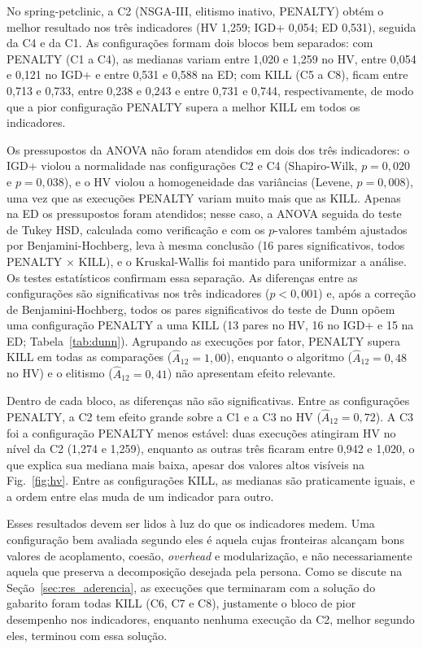 \documentclass[conference]{IEEEtran}
\begin{document}
No spring-petclinic, a C2 (NSGA-III, elitismo inativo, PENALTY) obtém o melhor resultado nos três indicadores (HV 1,259; IGD+ 0,054; ED 0,531), seguida da C4 e da C1. As configurações formam dois blocos bem separados: com PENALTY (C1 a C4), as medianas variam entre 1,020 e 1,259 no HV, entre 0,054 e 0,121 no IGD+ e entre 0,531 e 0,588 na ED; com KILL (C5 a C8), ficam entre 0,713 e 0,733, entre 0,238 e 0,243 e entre 0,731 e 0,744, respectivamente, de modo que a pior configuração PENALTY supera a melhor KILL em todos os indicadores.

Os pressupostos da ANOVA não foram atendidos em dois dos três indicadores: o IGD+ violou a normalidade nas configurações C2 e C4 (Shapiro-Wilk, $p=0{,}020$ e $p=0{,}038$), e o HV violou a homogeneidade das variâncias (Levene, $p=0{,}008$), uma vez que as execuções PENALTY variam muito mais que as KILL. Apenas na ED os pressupostos foram atendidos; nesse caso, a ANOVA seguida do teste de Tukey HSD, calculada como verificação e com os $p$-valores também ajustados por Benjamini-Hochberg, leva à mesma conclusão (16 pares significativos, todos PENALTY $\times$ KILL), e o Kruskal-Wallis foi mantido para uniformizar a análise. Os testes estatísticos confirmam essa separação. As diferenças entre as configurações são significativas nos três indicadores ($p<0{,}001$) e, após a correção de Benjamini-Hochberg, todos os pares significativos do teste de Dunn opõem uma configuração PENALTY a uma KILL (13 pares no HV, 16 no IGD+ e 15 na ED; Tabela~\ref{tab:dunn}). Agrupando as execuções por fator, PENALTY supera KILL em todas as comparações ($\hat{A}_{12}=1{,}00$), enquanto o algoritmo ($\hat{A}_{12}=0{,}48$ no HV) e o elitismo ($\hat{A}_{12}=0{,}41$) não apresentam efeito relevante.

Dentro de cada bloco, as diferenças não são significativas. Entre as configurações PENALTY, a C2 tem efeito grande sobre a C1 e a C3 no HV ($\hat{A}_{12}=0{,}72$). A C3 foi a configuração PENALTY menos estável: duas execuções atingiram HV no nível da C2 (1,274 e 1,259), enquanto as outras três ficaram entre 0,942 e 1,020, o que explica sua mediana mais baixa, apesar dos valores altos visíveis na Fig.~\ref{fig:hv}. Entre as configurações KILL, as medianas são praticamente iguais, e a ordem entre elas muda de um indicador para outro.

Esses resultados devem ser lidos à luz do que os indicadores medem. Uma configuração bem avaliada segundo eles é aquela cujas fronteiras alcançam bons valores de acoplamento, coesão, \textit{overhead} e modularização, e não necessariamente aquela que preserva a decomposição desejada pela persona. Como se discute na Seção~\ref{sec:res_aderencia}, as execuções que terminaram com a solução do gabarito foram todas KILL (C6, C7 e C8), justamente o bloco de pior desempenho nos indicadores, enquanto nenhuma execução da C2, melhor segundo eles, terminou com essa solução.
\end{document}
